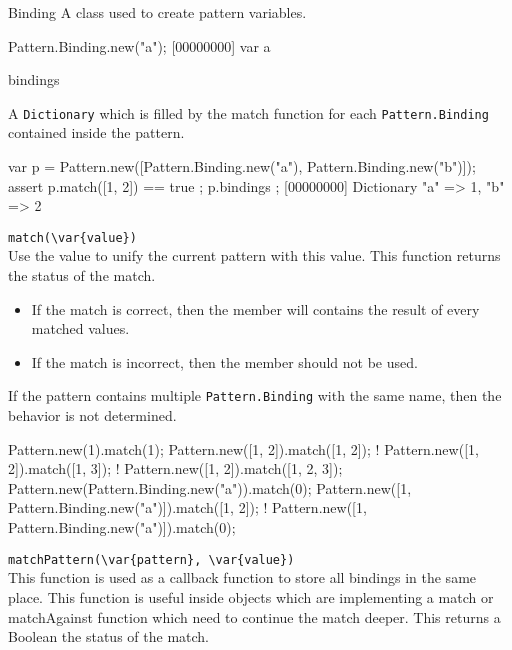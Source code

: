 \begin{urbiscriptapi}

\item[Binding]
  A class used to create pattern variables.

\begin{urbiscript}
Pattern.Binding.new("a");
[00000000] var a
\end{urbiscript}

\item[bindings]

  A \lstinline|Dictionary| which is filled by the match function for each
  \lstinline|Pattern.Binding| contained inside the pattern.

\begin{urbiscript}
{
  var p = Pattern.new([Pattern.Binding.new("a"), Pattern.Binding.new("b")]);
  assert {
    p.match([1, 2]) == true
  };
  p.bindings
};
[00000000] Dictionary {"a" => 1, "b" => 2}
\end{urbiscript}


\item \lstinline|match(\var{value})|\\

  Use the value to unify the current pattern with this value.  This function
  returns the status of the match.
  \begin{itemize}
    \item If the match is correct, then the  member will
      contains the result of every matched values.
    \item If the match is incorrect, then the  member should
      not be used.
  \end{itemize}
  If the pattern contains multiple \lstinline|Pattern.Binding| with the same
  name, then the behavior is not determined.

\begin{urbiassert}
Pattern.new(1).match(1);
Pattern.new([1, 2]).match([1, 2]);
! Pattern.new([1, 2]).match([1, 3]);
! Pattern.new([1, 2]).match([1, 2, 3]);
Pattern.new(Pattern.Binding.new("a")).match(0);
Pattern.new([1, Pattern.Binding.new("a")]).match([1, 2]);
! Pattern.new([1, Pattern.Binding.new("a")]).match(0);
\end{urbiassert}


\item \lstinline|matchPattern(\var{pattern}, \var{value})|\\

  This function is used as a callback function to store all bindings in the
  same place.  This function is useful inside objects which are implementing
  a match or matchAgainst function which need to continue the match deeper.
  This returns a Boolean the status of the match.


\end{urbiscriptapi}
